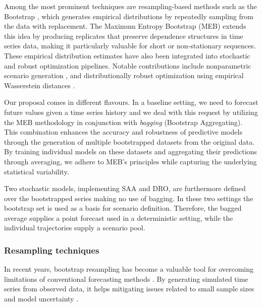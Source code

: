 \documentclass[mnsc,sglanonrev]{informs4}  %
\theoremstyle{remark}\newtheorem{remark}{Remark}
\begin{document}
Among the most prominent techniques are resampling-based methods such as the Bootstrap \citep{b1}, which generates empirical distributions by repeatedly sampling from the data with replacement. The Maximum Entropy Bootstrap (MEB) \citep{Vinod2004} extends this idea by producing replicates that preserve dependence structures in time series data, making it particularly valuable for short or non-stationary sequences. These empirical distribution estimates have also been integrated into stochastic and robust optimization pipelines. Notable contributions include nonparametric scenario generation \citep{BM11}, and distributionally robust optimization using empirical Wasserstein distances \citep{EK18}. 

Our proposal comes in different flavours. In a baseline setting, we need to forecast future values given a time series history and we deal with this request by utilizing the MEB methodology in conjunction with {\it bagging} (Bootstrap Aggregating). This combination enhances the accuracy and robustness of predictive models through the generation of multiple bootstrapped datasets from the original data. By training individual models on these datasets and aggregating their predictions through averaging, we adhere to MEB's principles while capturing the underlying statistical variability.

Two stochastic models, implementing SAA and DRO, are furthermore defined over the bootstrapped series making no use of bagging. In these two settings the bootstrap set is used as a basis for scenario definition. Therefore, the bagged average supplies a point forecast used in a deterministic setting, while the individual trajectories supply a scenario pool.

\subsubsection{Resampling techniques} \label{Subsec:resampling}

In recent years, bootstrap resampling has become a valuable tool for overcoming limitations of conventional forecasting methods \citep{hasni2019spare}. By generating simulated time series from observed data, it 
helps mitigating issues related to small sample sizes \citep{davison1997bootstrap} and model uncertainty \citep{sarris2020exploiting}.
\end{document}
